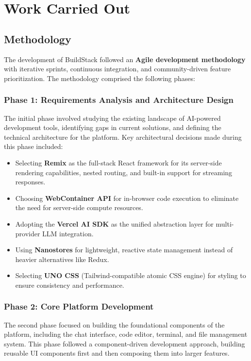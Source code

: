 \documentclass[12pt,a4paper,openany]{report}
\begin{document}
\chapter{Work Carried Out}

\section{Methodology}

The development of BuildStack followed an \textbf{Agile development methodology} with iterative sprints, continuous integration, and community-driven feature prioritization. The methodology comprised the following phases:

\subsection{Phase 1: Requirements Analysis and Architecture Design}
The initial phase involved studying the existing landscape of AI-powered development tools, identifying gaps in current solutions, and defining the technical architecture for the platform. Key architectural decisions made during this phase included:
\begin{itemize}
    \item Selecting \textbf{Remix} as the full-stack React framework for its server-side rendering capabilities, nested routing, and built-in support for streaming responses.
    \item Choosing \textbf{WebContainer API} for in-browser code execution to eliminate the need for server-side compute resources.
    \item Adopting the \textbf{Vercel AI SDK} as the unified abstraction layer for multi-provider LLM integration.
    \item Using \textbf{Nanostores} for lightweight, reactive state management instead of heavier alternatives like Redux.
    \item Selecting \textbf{UNO CSS} (Tailwind-compatible atomic CSS engine) for styling to ensure consistency and performance.
\end{itemize}

\subsection{Phase 2: Core Platform Development}
The second phase focused on building the foundational components of the platform, including the chat interface, code editor, terminal, and file management system. This phase followed a component-driven development approach, building reusable UI components first and then composing them into larger features.
\end{document}
